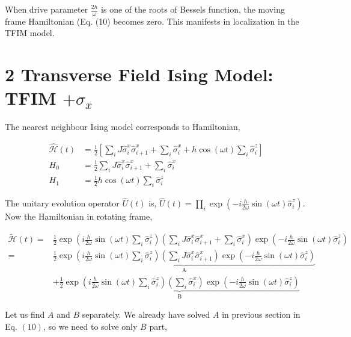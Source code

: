 \documentclass[a4paper,11pt]{article}
\begin{document}
When drive parameter $\frac{2 h}{\omega}$ is one of the roots of Bessels function, the moving frame Hamiltonian (Eq. (10) becomes zero. This manifests in localization in the TFIM model.

\section*{2 Transverse Field Ising Model: TFIM $+\sigma_{x}$}
The nearest neighbour Ising model corresponds to Hamiltonian,

\begin{align}
\hat{\mathcal{H}}(t) & =\frac{1}{2}\left[\sum_{i} J \hat{\sigma}_{i}^{x} \hat{\sigma}_{i+1}^{x}+\sum_{i} \hat{\sigma}_{i}^{x}+h \cos (\omega t) \sum_{i} \hat{\sigma}_{i}^{z}\right]\\
H_{0} & =\frac{1}{2} \sum_{i} J \hat{\sigma}_{i}^{x} \hat{\sigma}_{i+1}^{x}+\sum_{i} \hat{\sigma}_{i}^{x} \nonumber\\
H_{1} & =\frac{1}{2} h \cos (\omega t) \sum_{i} \hat{\sigma}_{i}^{z}\nonumber
\end{align}

The unitary evolution operator $\hat{U}(t)$ is, $\hat{U}(t)=\prod_{i} \exp \left(-i \frac{h}{2 \omega} \sin (\omega t) \hat{\sigma}_{i}^{z}\right)$. Now the Hamiltonian in rotating frame,

\begin{align}
\tilde{\mathcal{H}}(t)= & \frac{1}{2} \exp \left(i \frac{h}{2 \omega} \sin (\omega t) \sum_{i} \hat{\sigma}_{i}^{z}\right)\left(\sum_{i} J \hat{\sigma}_{i}^{x} \hat{\sigma}_{i+1}^{x}+\sum_{i} \hat{\sigma}_{i}^{x}\right) \exp \left(-i \frac{h}{2 \omega} \sin (\omega t) \hat{\sigma}_{i}^{z}\right) \nonumber\\
= & \underbrace{\frac{1}{2} \exp \left(i \frac{h}{2 \omega} \sin (\omega t) \sum_{i} \hat{\sigma}_{i}^{z}\right)\left(\sum_{i} J \hat{\sigma}_{i}^{x} \hat{\sigma}_{i+1}^{x}\right) \exp \left(-i \frac{h}{2 \omega} \sin (\omega t) \hat{\sigma}_{i}^{z}\right)}_{\mathrm{A}} \nonumber\\
& +\underbrace{\frac{1}{2} \exp \left(i \frac{h}{2 \omega} \sin (\omega t) \sum_{i} \hat{\sigma}_{i}^{z}\right)\left(\sum_{i} \hat{\sigma}_{i}^{x}\right) \exp \left(-i \frac{h}{2 \omega} \sin (\omega t) \hat{\sigma}_{i}^{z}\right)}_{\mathrm{B}}
\end{align}

Let us find $A$ and $B$ separately. We already have solved $A$ in previous section in Eq. $(10)$, so we need to solve only $B$ part,
\end{document}

